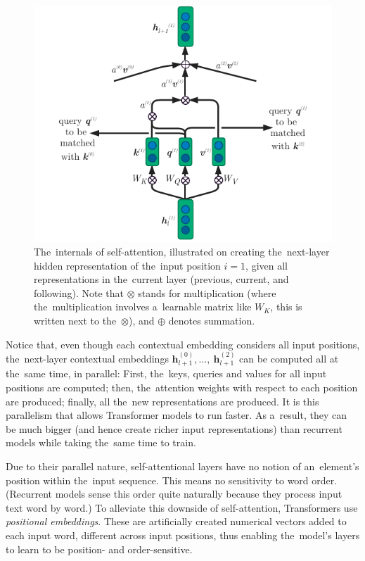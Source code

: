 \documentclass[bsc,frontabs,singlespacing,parskip,deptreport]{infthesis}
\begin{document}
{{{      \begin{figure}[h!t]
        \centering
        \includegraphics[width=12cm]{graphics/self-att}
        \cprotect\caption{The~internals of self-attention, illustrated on creating the~next-layer hidden representation of the~input position $i=1$, given all representations in the~current layer (previous, current, and following). Note that $\otimes$ stands for multiplication (where the~multiplication involves a~learnable matrix like $W_K$, this is written next to the~$\otimes$), and $\oplus$ denotes summation.}
        \label{fig:self-att}
      \end{figure}

      Notice that, even though each contextual embedding considers all input positions, the~next-layer contextual embeddings $\bm{h}_{l+1}^{(0)},\ldots,\ \bm{h}_{l+1}^{(2)}$ can be computed all at the~same time, in parallel: First, the~keys, queries and values for all input positions are computed; then, the~attention weights with respect to each position are produced; finally, all the~new representations are produced. It is this parallelism that allows Transformer models to run faster. As a~result, they can be much bigger (and hence create richer input representations) than recurrent models while taking the~same time to train.

      Due to their parallel nature, self-attentional layers have no notion of an~element's position within the~input sequence. This means no sensitivity to word order. (Recurrent models sense this order quite naturally because they process input text word by word.) To alleviate this downside of self-attention, Transformers use \textit{positional embeddings}. These are artificially created numerical vectors added to each input word, different across input positions, thus enabling the~model's layers to learn to be position- and order-sensitive.

}}}
\end{document}
